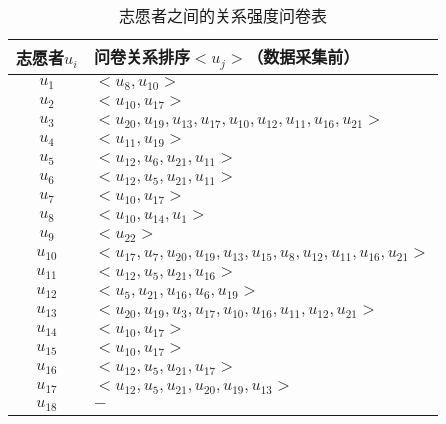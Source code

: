 \begin{table}[htb]
\wuhao
  \centering
  \begin{minipage}[t]{0.8\linewidth} %
  \caption[志愿者的关系强度问卷表]{志愿者之间的关系强度问卷表}
  \label{tab:truthresult}
    \begin{tabular*}{\linewidth}{cp{10cm}}
      \toprule[1.5pt]
      {志愿者\mbox{$u_{i}$}} & {问卷关系排序\mbox{$<u_{j}>$}（数据采集前）}  \\
      \midrule[1pt]
      \mbox{$u_{1}$} & \mbox{$<u_{8},u_{10}>$}  \\
      \hline
      \mbox{$u_{2}$} & \mbox{$<u_{10},u_{17}>$}  \\
      \hline
      \mbox{$u_{3} $}&\mbox{$ <u_{20},u_{19},u_{13},u_{17},u_{10},u_{12},u_{11},u_{16},u_{21}>$}\\
      \hline
      \mbox{$u_{4}$} & \mbox{$<u_{11},u_{19}>$}\\
      \hline
      \mbox{$u_{5} $}& \mbox{$<u_{12},u_{6},u_{21},u_{11}>$}\\
      \hline
      \mbox{$u_{6}$} & \mbox{$<u_{12},u_{5},u_{21},u_{11}>$}\\
      \hline
      \mbox{$u_{7}$} & \mbox{$<u_{10},u_{17}>$}\\
      \hline
      \mbox{$u_{8}$} &\mbox{$ <u_{10},u_{14},u_{1}>$}\\
      \hline
      \mbox{$u_{9} $}& \mbox{$<u_{22}>$}\\
      \hline
      \mbox{$u_{10} $}& \mbox{$<u_{17},u_{7},u_{20},u_{19},u_{13},u_{15},u_{8},u_{12},u_{11},u_{16},u_{21}>$}\\
      \hline
      \mbox{$u_{11} $}&  \mbox{$<u_{12},u_{5},u_{21},u_{16}>$}\\
      \hline
      \mbox{$u_{12} $}& \mbox{$ <u_{5},u_{21},u_{16},u_{6},u_{19}>$}\\
      \hline
      \mbox{$u_{13}$} &\mbox{$ <u_{20},u_{19},u_{3},u_{17},u_{10},u_{16},u_{11},u_{12},u_{21}>$}\\
      \hline
      \mbox{$u_{14}$} &\mbox{$ <u_{10},u_{17} >$}\\
      \hline
      \mbox{$u_{15}$} & \mbox{$<u_{10},u_{17}>$}\\
      \hline
      \mbox{$u_{16}$} &\mbox{$ <u_{12},u_{5},u_{21},u_{17}>$}\\
      \hline
      \mbox{$u_{17} $}& \mbox{$< u_{12},u_{5},u_{21},u_{20},u_{19},u_{13}   >$}\\
      \hline
      \mbox{$u_{18} $}&\mbox{$ -$}\\

\end{tabular*}
\end{minipage}
\end{table}
